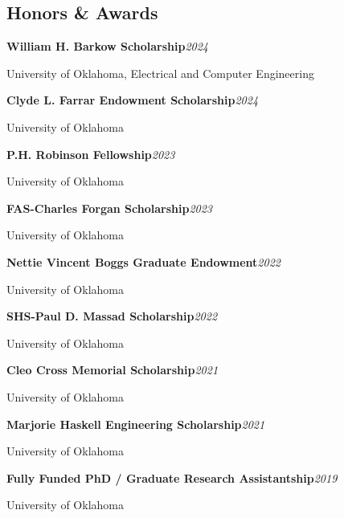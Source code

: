 \documentclass[9pt,letterpaper]{extarticle}
\newcommand{\entry}[2]{\Needspace{4\baselineskip}\textbf{#1}\hfill\textit{#2}\par}
\begin{document}
\subsection{Honors \& Awards}
\entry{William H. Barkow Scholarship}{2024}
{\small University of Oklahoma, Electrical and Computer Engineering\par}
\entry{Clyde L. Farrar Endowment Scholarship}{2024}
{\small University of Oklahoma\par}
\entry{P.H. Robinson Fellowship}{2023}
{\small University of Oklahoma\par}
\entry{FAS-Charles Forgan Scholarship}{2023}
{\small University of Oklahoma\par}
\entry{Nettie Vincent Boggs Graduate Endowment}{2022}
{\small University of Oklahoma\par}
\entry{SHS-Paul D. Massad Scholarship}{2022}
{\small University of Oklahoma\par}
\entry{Cleo Cross Memorial Scholarship}{2021}
{\small University of Oklahoma\par}
\entry{Marjorie Haskell Engineering Scholarship}{2021}
{\small University of Oklahoma\par}
\entry{Fully Funded PhD / Graduate Research Assistantship}{2019}
{\small University of Oklahoma\par}
\end{document}
